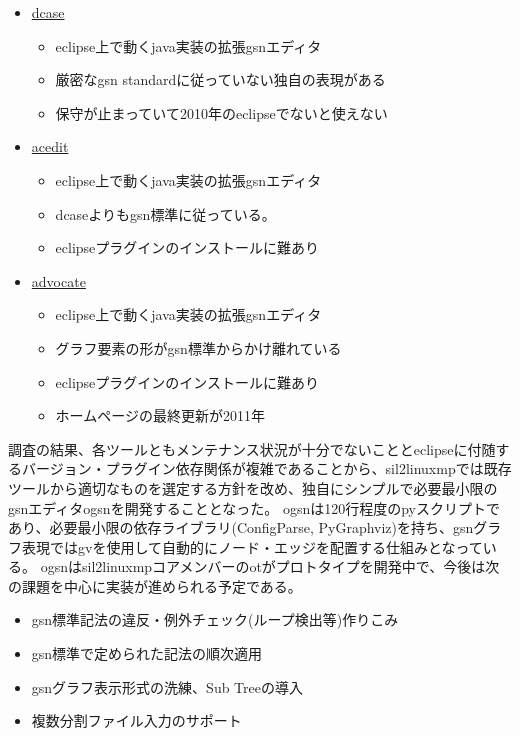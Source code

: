 \begin{itemize}
  \item \href{http://wiki.portal.chalmers.se/agda/pmwiki.php?n=D-Case-Agda.D-Case-Agda}{\acrshort{dcase}} \cite{dcase}
  \begin{itemize}
    \item \acrshort{eclipse}上で動く\acrshort{java}実装の拡張\acrshort{gsn}エディタ
    \item 厳密な\acrshort{gsn} standardに従っていない独自の表現がある
    \item 保守が止まっていて2010年の\acrshort{eclipse}でないと使えない
  \end{itemize}
  \item \href{https://code.google.com/p/acedit/}{\gls{acedit}} \cite{acedit}
  \begin{itemize}
    \item \acrshort{eclipse}上で動く\acrshort{java}実装の拡張\acrshort{gsn}エディタ
    \item \acrshort{dcase}よりも\acrshort{gsn}標準に従っている。
    \item \acrshort{eclipse}プラグインのインストールに難あり
  \end{itemize}
  \item \href{http://ti.arc.nasa.gov/m/profile/edenney/papers/sassur2012.pdf}{\acrshort{advocate}} \cite{advocate}
  \begin{itemize} 
    \item \acrshort{eclipse}上で動く\acrshort{java}実装の拡張\acrshort{gsn}エディタ
    \item グラフ要素の形が\acrshort{gsn}標準からかけ離れている
    \item \acrshort{eclipse}プラグインのインストールに難あり
    \item ホームページの最終更新が2011年
  \end{itemize}
\end{itemize}
\par
調査の結果、各ツールともメンテナンス状況が十分でないことと\acrshort{eclipse}に付随するバージョン・プラグイン依存関係が複雑であることから、\acrshort{sil2linuxmp}では既存ツールから適切なものを選定する方針を改め、独自にシンプルで必要最小限の\acrshort{gsn}エディタ\gls{ogsn}を開発することとなった。
\acrshort{ogsn}は120行程度の\acrshort{py}スクリプトであり、必要最小限の依存ライブラリ(ConfigParse, PyGraphviz)を持ち、\acrshort{gsn}グラフ表現では\acrshort{gv}を使用して自動的にノード・エッジを配置する仕組みとなっている。
\acrshort{ogsn}は\acrshort{sil2linuxmp}コアメンバーの\acrshort{ot}がプロトタイプを開発中で、今後は次の課題を中心に実装が進められる予定である。
\begin{itemize}
  \item \acrshort{gsn}標準記法の違反・例外チェック(ループ検出等)作りこみ
  \item \acrshort{gsn}標準で定められた記法の順次適用
  \item \acrshort{gsn}グラフ表示形式の洗練、Sub Treeの導入
  \item 複数分割ファイル入力のサポート
\end{itemize}
